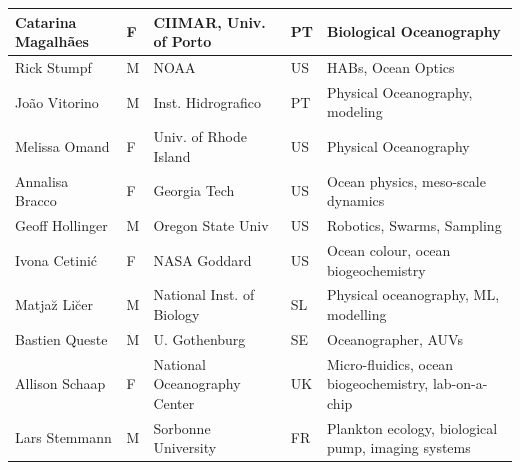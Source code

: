 \begin{table}[H]
{\begin{tabular}{|p{3.5cm}|p{0.7cm}|p{4.0cm}|p{0.5cm}|p{6.0cm}|}
  \hline
  Catarina Magalh\~aes      & F   & CIIMAR, Univ. of Porto                & PT       & Biological Oceanography                         \\
  \hline
  Rick Stumpf              & M   & NOAA                                  & US       & HABs, Ocean Optics                              \\
  \hline
  Jo\~ao Vitorino            & M   & Inst. Hidrografico                    & PT       & Physical Oceanography, modeling                    \\
  \hline
  Melissa Omand            & F   & Univ. of Rhode Island                 & US       & Physical Oceanography                              \\
  \hline
  Annalisa Bracco          & F   & Georgia Tech                          & US       & Ocean physics, meso-scale dynamics              \\
  \hline
  Geoff Hollinger          & M   & Oregon State Univ                     & US       & Robotics, Swarms, Sampling                              \\
  \hline
  Ivona Cetini\'{c}            & F   & NASA Goddard                            & US       & Ocean colour, ocean biogeochemistry  \\
  \hline
  Matja\u{z} Li\u{c}er             & M   & National Inst. of Biology                                   & SL & Physical oceanography, ML, modelling            \\
  \hline
  Bastien Queste           & M   & U. Gothenburg                         & SE       & Oceanographer, AUVs\\                            
  \hline
  Allison Schaap           & F   & National Oceanography Center              & UK       & Micro-fluidics, ocean biogeochemistry, lab-on-a-chip\\
  \hline
  Lars Stemmann            & M & Sorbonne University                     & FR & Plankton ecology, biological pump, imaging systems\\

\end{tabular}}
\end{table}
